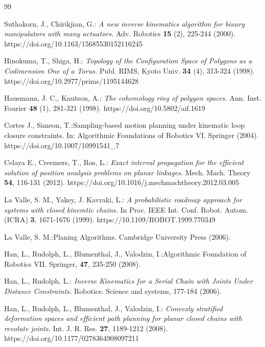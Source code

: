 \documentclass[10pt,a4paper]{article}
\theoremstyle{definition}
\theoremstyle{remark}
\numberwithin{equation}{section}
\begin{document}
\begin{thebibliography}{99}

 Suthakorn, J.,  Chirikjian, G.: \emph{A new inverse kinematics algorithm for binary manipulators with many actuators.} Adv. Robotics \textbf{15} (2), 225-244 (2000). https://doi.org/10.1163/15685530152116245


Hinokuma, T., Shiga, H.: \emph{Topology of the Configuration Space of Polygons as a Codimension One of a Torus.} Publ. RIMS, Kyoto Univ. \textbf{34} (4), 313-324 (1998). https://doi.org/10.2977/prims/1195144628

 Hausmann, J. C., Knutson, A.: \emph{The cohomology ring of polygon spaces.} Ann. Inst. Fourier \textbf{48} (1), 281-321 (1998). https://doi.org/10.5802/aif.1619 

  Cortes  J., Simeon, T.:{Sampling-based motion planning under kinematic loop closure constraints.} In: Algorithmic Foundations of Robotics VI. Springer (2004). https://doi.org/10.1007/10991541\_7

 Celaya E.,  Creemers, T.,  Ros, L.: \emph{Exact interval propagation for the efficient solution of position analysis problems on planar linkages.} Mech. Mach. Theory  \textbf{54}, 116-131 (2012). https://doi.org/10.1016/j.mechmachtheory.2012.03.005 


 La Valle, S. M.,  Yakey,  J. Kavraki, L.: \emph{A probabilistic roadmap approach for systems with closed kinemtic chains.} In Proc. IEEE Int. Conf. Robot. Autom. (ICRA)  \textbf{3}, 1671-1676 (1999). https://10.1109/ROBOT.1999.770349 


 La Valle, S. M.:{Planing Algorithms.} Cambridge University Press (2006). 

  Han, L., Rudolph, L., Blumenthal, J.,  Valodzin, I.:{Algorithmic Foundation of Robotics VII.}  Springer, \textbf{47}, 235-250 (2008).  


Han, L.,  Rudolph, L.: \emph{Inverse Kinematics for a Serial Chain with Joints Under Distance Constraints.} Robotics: Science and systems, 177-184 (2006). 


 Han, L., Rudolph, L., Blumenthal, J., Valodzin, I.: \emph{Convexly stratified deformation spaces and efficient path planning for planar closed chains with revolute joints.} Int. J. R. Res. \textbf{27}, 1189-1212 (2008). https://doi.org/10.1177/0278364908097211


\end{thebibliography}
\end{document}
